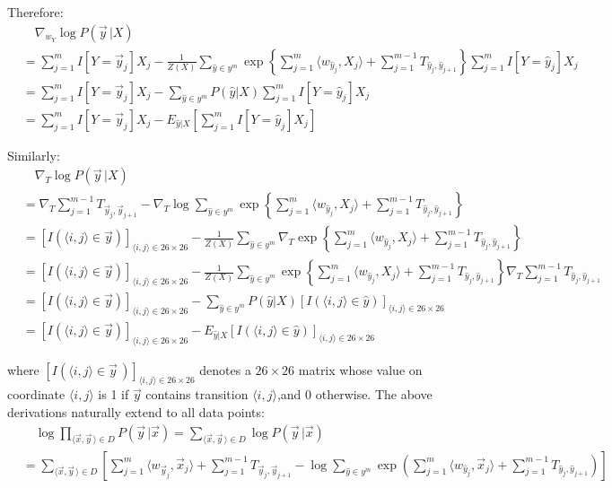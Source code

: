 \documentclass[11pt,a4paper]{article}
\begin{document}
\begin{enumerate}[label=(\alph*)]
Therefore:
\begin{align*}
&\quad\nabla_{w_Y}\log P(\vec{y}\,|X)\\
&=\sum_{j=1}^m I[Y=\vec{y}_j]X_j-\frac{1}{Z(X)}\sum_{\hat{y}\in y^m}\exp\left\{\sum_{j=1}^m\langle w_{\hat{y}_j},X_j\rangle+\sum_{j=1}^{m-1}T_{\hat{y}_j,\hat{y}_{j+1}}\right\}\sum_{j=1}^m I[Y=\hat{y}_j]X_j\\
&=\sum_{j=1}^m I[Y=\vec{y}_j]X_j-\sum_{\hat{y}\in y^m}P(\hat{y}|X)\sum_{j=1}^m I[Y=\hat{y}_j]X_j\\
&=\sum_{j=1}^m I[Y=\vec{y}_j]X_j-E_{\hat{y}|X}\left[\sum_{j=1}^m I[Y=\hat{y}_j]X_j\right]
\end{align*}

Similarly:
\begin{align*}
&\quad\nabla_T\log P(\vec{y}\,|X)\\
&=\nabla_T\sum_{j=1}^{m-1}T_{\vec{y}_j,\vec{y}_{j+1}}-\nabla_T\log\sum_{\hat{y}\in y^m}\exp\left\{\sum_{j=1}^m\langle w_{\hat{y}_j},X_j\rangle+\sum_{j=1}^{m-1}T_{\hat{y}_j,\hat{y}_{j+1}}\right\}\\
&=[I(\langle i,j\rangle\in\vec{y})]_{\langle i,j\rangle \in 26\times 26}-\frac{1}{Z(X)}\sum_{\hat{y}\in y^m}\nabla_T\exp\left\{\sum_{j=1}^m\langle w_{\hat{y}_j},X_j\rangle+\sum_{j=1}^{m-1}T_{\hat{y}_j,\hat{y}_{j+1}}\right\}\\
&=[I(\langle i,j\rangle\in\vec{y})]_{\langle i,j\rangle \in 26\times 26}-\frac{1}{Z(X)}\sum_{\hat{y}\in y^m}\exp\left\{\sum_{j=1}^m\langle w_{\hat{y}_j},X_j\rangle+\sum_{j=1}^{m-1}T_{\hat{y}_j,\hat{y}_{j+1}}\right\}\nabla_T\sum_{j=1}^{m-1}T_{\hat{y}_j,\hat{y}_{j+1}}\\
&=[I(\langle i,j\rangle\in\vec{y})]_{\langle i,j\rangle \in 26\times 26}-\sum_{\hat{y}\in y^m}P(\hat{y}|X)[I(\langle i,j\rangle\in\hat{y})]_{\langle i,j\rangle \in 26\times 26}\\
&=[I(\langle i,j\rangle\in\vec{y})]_{\langle i,j\rangle \in 26\times 26}-E_{\hat{y}|X}[I(\langle i,j\rangle\in\hat{y})]_{\langle i,j\rangle \in 26\times 26}
\end{align*}

where $[I(\langle i,j\rangle\in\vec{y}\,)]_{\langle i,j\rangle \in 26\times 26}$ denotes a $26\times 26$ matrix whose value on coordinate $\langle i,j\rangle$ is 1 if $\vec{y}$ contains transition $\langle i,j\rangle$,and 0 otherwise. The above derivations naturally extend to all data points:
\begin{align*}
&\quad\log\prod_{\langle\vec{x},\vec{y}\,\rangle\in D}P(\vec{y}\,|\vec{x})=\sum_{\langle\vec{x},\vec{y}\,\rangle\in D}\log P(\vec{y}\,|\vec{x})\\
&=\sum_{\langle\vec{x},\vec{y}\,\rangle\in D}\left[\sum_{j=1}^m\langle w_{\vec{y}_j},\vec{x}_j\rangle+\sum_{j=1}^{m-1}T_{\vec{y}_j,\vec{y}_{j+1}}-\log\sum_{\hat{y}\in y^m}\exp\left(\sum_{j=1}^m\langle w_{\hat{y}_j},\vec{x}_j\rangle+\sum_{j=1}^{m-1}T_{\hat{y}_j,\hat{y}_{j+1}}\right)\right]
\end{align*}


\end{enumerate}
\end{document}
